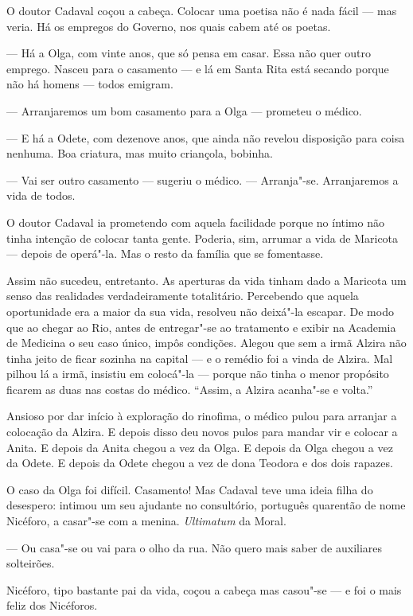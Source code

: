 O doutor Cadaval coçou a cabeça. Colocar uma poetisa não é nada fácil
--- mas veria. Há os empregos do Governo, nos quais cabem até os poetas.

--- Há a Olga, com vinte anos, que só pensa em casar. Essa não quer
outro emprego. Nasceu para o casamento --- e lá em Santa Rita está
secando porque não há homens --- todos emigram.

--- Arranjaremos um bom casamento para a Olga --- prometeu o médico.

--- E há a Odete, com dezenove anos, que ainda não revelou disposição
para coisa nenhuma. Boa criatura, mas muito criançola, bobinha.

--- Vai ser outro casamento --- sugeriu o médico. --- Arranja"-se.
Arranjaremos a vida de todos.

O doutor Cadaval ia prometendo com aquela facilidade porque no íntimo
não tinha intenção de colocar tanta gente. Poderia, sim, arrumar a vida
de Maricota --- depois de operá"-la. Mas o resto da família que se
fomentasse.

Assim não sucedeu, entretanto. As aperturas da vida tinham dado a
Maricota um senso das realidades verdadeiramente totalitário. Percebendo
que aquela oportunidade era a maior da sua vida, resolveu não deixá"-la
escapar. De modo que ao chegar ao Rio, antes de entregar"-se ao
tratamento e exibir na Academia de Medicina o seu caso único, impôs
condições. Alegou que sem a irmã Alzira não tinha jeito de ficar sozinha
na capital --- e o remédio foi a vinda de Alzira. Mal pilhou lá a irmã,
insistiu em colocá"-la --- porque não tinha o menor propósito ficarem as
duas nas costas do médico. ``Assim, a Alzira acanha"-se e volta.''

Ansioso por dar início à exploração do rinofima, o médico pulou para
arranjar a colocação da Alzira. E depois disso deu novos pulos para
mandar vir e colocar a Anita. E depois da Anita chegou a vez da Olga. E
depois da Olga chegou a vez da Odete. E depois da Odete chegou a vez de
dona Teodora e dos dois rapazes.

O caso da Olga foi difícil. Casamento! Mas Cadaval teve uma ideia filha
do desespero: intimou um seu ajudante no consultório, português
quarentão de nome Nicéforo, a casar"-se com a menina. \emph{Ultimatum} da
Moral.

--- Ou casa"-se ou vai para o olho da rua. Não quero mais saber de
auxiliares solteirões.

Nicéforo, tipo bastante pai da vida, coçou a cabeça mas casou"-se --- e
foi o mais feliz dos Nicéforos.

